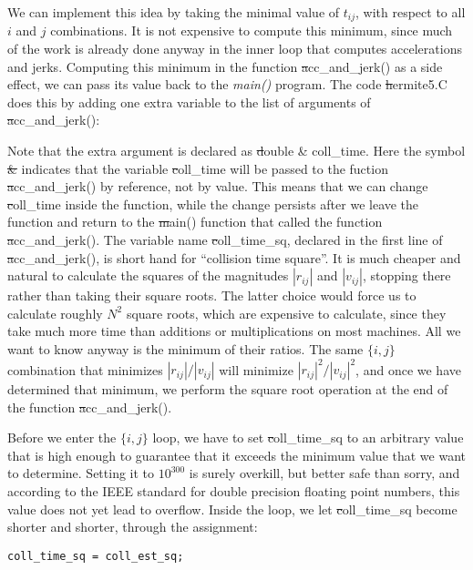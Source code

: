 We can implement this idea by taking the minimal value of $t_{ij}$,
with respect to all $i$ and $j$ combinations.  It is not expensive to
compute this minimum, since much of the work is already done anyway in
the inner loop that computes accelerations and jerks.  Computing this
minimum in the function {\st acc\_and\_jerk()} as a side effect, we
can pass its value back to the {\sl main()} program.  The code
{\st hermite5.C} does this by adding one extra variable to the list of
arguments of {\st acc\_and\_jerk()}:


Note that the extra argument is declared as {\st double \& coll\_time}.
Here the symbol {\st \&} indicates that the variable {\st coll\_time}
will be passed to the fuction {\st acc\_and\_jerk()} by reference, not
by value.  This means that we can change {\st coll\_time} inside the
function, while the change persists after we leave the function and
return to the {\st main()} function that called the function
{\st acc\_and\_jerk()}.  The variable name {\st coll\_time\_sq},
declared in the first line of {\st acc\_and\_jerk()}, is short hand
for ``collision time square''.  It is much cheaper and natural to
calculate the squares of the magnitudes $|r_{ij}|$ and $|v_{ij}|$,
stopping there rather than taking their square roots.  The latter
choice would force us to calculate roughly $N^2$ square roots, which
are expensive to calculate, since they take much more time than
additions or multiplications on most machines.  All we want to know
anyway is the minimum of their ratios.  The same $\{i, j\}$
combination that minimizes $|r_{ij}|/|v_{ij}|$ will minimize
$|r_{ij}|^2/|v_{ij}|^2$, and once we have determined that minimum,
we perform the square root operation at the end of the function 
{\st acc\_and\_jerk()}.

Before we enter the $\{i, j\}$ loop, we have to set {\st coll\_time\_sq} to
an arbitrary value that is high enough to guarantee that it exceeds
the minimum value that we want to determine.  Setting it to $10^{300}$
is surely overkill, but better safe than sorry, and according to the IEEE
standard for double precision floating point numbers, this value does
not yet lead to overflow.  Inside the loop, we let {\st coll\_time\_sq}
become shorter and shorter, through the assignment:

\begin{small}
\begin{verbatim}
coll_time_sq = coll_est_sq;
\end{verbatim}
\end{small}

